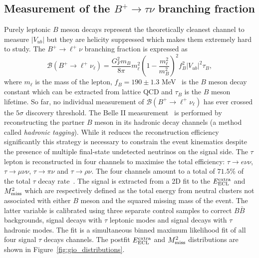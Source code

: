 \documentclass{moriond}
\def\vub{V_{ub}}
\def\eecl{E_{\rm ECL}^{\rm extra}}
\def\mmiss{M_{\rm miss}^2}
\begin{document}
\subsection{Measurement of the $B^+ \to \tau \nu$ branching fraction}
Purely leptonic $B$ meson decays represent the theoretically cleanest channel to measure $|\vub|$ but they are helicity suppressed which makes them extremely hard to study. The $B^+ \to \ell^+ \nu$ branching fraction is expressed as
\begin{equation}
    \mathcal{B}(B^+ \to \ell^+\nu_\ell) = \frac{G_F^2m_B}{8\pi}m_\ell^2\left( 1 - \frac{m_\ell^2}{m_B^2} \right)^2 f_B^2|V_{ub}|^2\tau_B,
\end{equation}
where $m_\ell$ is the mass of the lepton, $f_B = 190 \pm 1.3$ MeV~\cite{flag} is the $B$ meson decay constant which can be extracted from lattice QCD and $\tau_B$ is the $B$ meson lifetime. So far, no individual measurement of $\mathcal{B}(B^+ \to \ell^+\nu_\ell)$ has ever crossed the $5\sigma$ discovery threshold. The Belle II measurement~\cite{gio} is performed by reconstructing the partner $B$ meson in its hadronic decay channels (a method called \textit{hadronic tagging}). While it reduces the reconstruction efficiency significantly this strategy is necessary to constrain the event kinematics despite the presence of multiple final-state undetected neutrinos on the signal side. The $\tau$ lepton is reconstructed in four channels to maximise the total efficiency: $\tau \to e\nu\nu$, $\tau \to \mu\nu\nu$, $\tau \to \pi\nu$ and $\tau \to \rho\nu$. The four channels amount to a total of $71.5\%$ of the total $\tau$ decay rate~\cite{pdg}. The signal is extracted from a 2D fit to the $\eecl$ and $\mmiss$ which are respectively defined as the total energy from neutral clusters not associated with either $B$ meson and the squared missing mass of the event. The latter variable is calibrated using three separate control samples to correct $B\bar{B}$ backgrounds, signal decays with $\tau$ leptonic modes and signal decays with $\tau$ hadronic modes. The fit is a simultaneous binned maximum likelihood fit of all four signal $\tau$ decays channels. The postfit $\eecl$ and $\mmiss$ distributions are shown in Figure~\ref{fig:gio_distributions}.
\end{document}
